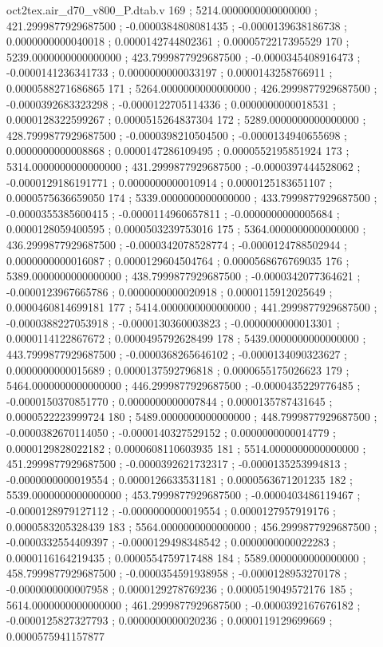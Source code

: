\begin{filecontents}[overwrite]{oct2tex.air_d70_v800_P.dtab.v}
169 ; 5214.0000000000000000 ; 421.2999877929687500 ; -0.0000384808081435 ; -0.0000139638186738 ; 0.0000000000040018 ; 0.0000142744802361 ; 0.0000572217395529
170 ; 5239.0000000000000000 ; 423.7999877929687500 ; -0.0000345408916473 ; -0.0000141236341733 ; 0.0000000000033197 ; 0.0000143258766911 ; 0.0000588271686865
171 ; 5264.0000000000000000 ; 426.2999877929687500 ; -0.0000392683323298 ; -0.0000122705114336 ; 0.0000000000018531 ; 0.0000128322599267 ; 0.0000515264837304
172 ; 5289.0000000000000000 ; 428.7999877929687500 ; -0.0000398210504500 ; -0.0000134940655698 ; 0.0000000000008868 ; 0.0000147286109495 ; 0.0000552195851924
173 ; 5314.0000000000000000 ; 431.2999877929687500 ; -0.0000397444528062 ; -0.0000129186191771 ; 0.0000000000010914 ; 0.0000125183651107 ; 0.0000575636659050
174 ; 5339.0000000000000000 ; 433.7999877929687500 ; -0.0000355385600415 ; -0.0000114960657811 ; -0.0000000000005684 ; 0.0000128059400595 ; 0.0000503239753016
175 ; 5364.0000000000000000 ; 436.2999877929687500 ; -0.0000342078528774 ; -0.0000124788502944 ; 0.0000000000016087 ; 0.0000129604504764 ; 0.0000568676769035
176 ; 5389.0000000000000000 ; 438.7999877929687500 ; -0.0000342077364621 ; -0.0000123967665786 ; 0.0000000000020918 ; 0.0000115912025649 ; 0.0000460814699181
177 ; 5414.0000000000000000 ; 441.2999877929687500 ; -0.0000388227053918 ; -0.0000130360003823 ; -0.0000000000013301 ; 0.0000114122867672 ; 0.0000495792628499
178 ; 5439.0000000000000000 ; 443.7999877929687500 ; -0.0000368265646102 ; -0.0000134090323627 ; 0.0000000000015689 ; 0.0000137592796818 ; 0.0000655175026623
179 ; 5464.0000000000000000 ; 446.2999877929687500 ; -0.0000435229776485 ; -0.0000150370851770 ; 0.0000000000007844 ; 0.0000135787431645 ; 0.0000522223999724
180 ; 5489.0000000000000000 ; 448.7999877929687500 ; -0.0000382670114050 ; -0.0000140327529152 ; 0.0000000000014779 ; 0.0000129828022182 ; 0.0000608110603935
181 ; 5514.0000000000000000 ; 451.2999877929687500 ; -0.0000392621732317 ; -0.0000135253994813 ; -0.0000000000019554 ; 0.0000126633531181 ; 0.0000563671201235
182 ; 5539.0000000000000000 ; 453.7999877929687500 ; -0.0000403486119467 ; -0.0000128979127112 ; -0.0000000000019554 ; 0.0000127957919176 ; 0.0000583205328439
183 ; 5564.0000000000000000 ; 456.2999877929687500 ; -0.0000332554409397 ; -0.0000129498348542 ; 0.0000000000022283 ; 0.0000116164219435 ; 0.0000554759717488
184 ; 5589.0000000000000000 ; 458.7999877929687500 ; -0.0000354591938958 ; -0.0000128953270178 ; -0.0000000000007958 ; 0.0000129278769236 ; 0.0000519049572176
185 ; 5614.0000000000000000 ; 461.2999877929687500 ; -0.0000392167676182 ; -0.0000125827327793 ; 0.0000000000020236 ; 0.0000119129699669 ; 0.0000575941157877

\end{filecontents}

